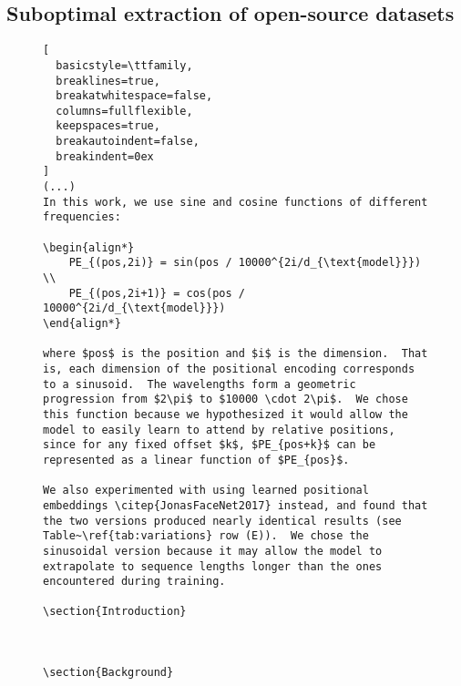 \subsection{Suboptimal extraction of open-source datasets}\label{appendix:suboptimal-arxiv-wiki}

\begin{figure}[h]
\centering
\begin{tcolorbox}[colframe=black!80!white, colback=black!2!white, boxrule=0.5mm, width=\textwidth, arc=2mm, auto outer arc, title=Example of suboptimal extraction from arXiv, fonttitle=\color{white}\bfseries]
\begin{lstlisting}[
  basicstyle=\ttfamily,
  breaklines=true,
  breakatwhitespace=false,
  columns=fullflexible,
  keepspaces=true,
  breakautoindent=false,
  breakindent=0ex
]
(...)
In this work, we use sine and cosine functions of different frequencies:

\begin{align*}
    PE_{(pos,2i)} = sin(pos / 10000^{2i/d_{\text{model}}}) \\
    PE_{(pos,2i+1)} = cos(pos / 10000^{2i/d_{\text{model}}})
\end{align*}

where $pos$ is the position and $i$ is the dimension.  That is, each dimension of the positional encoding corresponds to a sinusoid.  The wavelengths form a geometric progression from $2\pi$ to $10000 \cdot 2\pi$.  We chose this function because we hypothesized it would allow the model to easily learn to attend by relative positions, since for any fixed offset $k$, $PE_{pos+k}$ can be represented as a linear function of $PE_{pos}$.

We also experimented with using learned positional embeddings \citep{JonasFaceNet2017} instead, and found that the two versions produced nearly identical results (see Table~\ref{tab:variations} row (E)).  We chose the sinusoidal version because it may allow the model to extrapolate to sequence lengths longer than the ones encountered during training.

\section{Introduction}



\section{Background}


\end{lstlisting}
\end{tcolorbox}
\end{figure}
